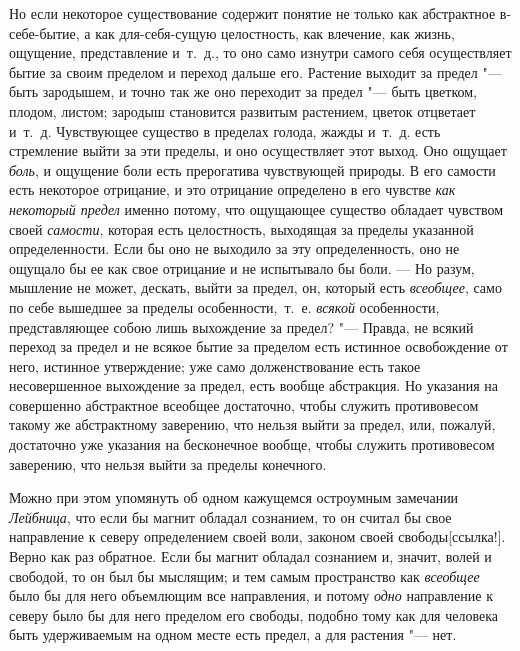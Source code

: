 Но если некоторое существование содержит понятие не только как абстрактное
в-себе-бытие, а как для-себя-сущую целостность, как влечение, как жизнь,
ощущение, представление и~т.~д., то оно само изнутри самого себя
осуществляет бытие за своим пределом и переход дальше его. Растение выходит
за предел "--- быть зародышем, и точно так же оно переходит за предел "--- быть
цветком, плодом, листом; зародыш становится развитым растением, цветок
отцветает и~т.~д. Чувствующее существо в пределах голода, жажды и~т.~д.
есть стремление выйти за эти пределы, и оно осуществляет этот выход. Оно
ощущает {\em боль}, и ощущение боли есть прерогатива
чувствующей природы. В его самости есть некоторое отрицание, и это
отрицание определено в его чувстве {\em как некоторый
предел} именно потому, что ощущающее существо обладает чувством своей
{\em самости}, которая есть целостность, выходящая за
пределы указанной определенности. Если бы оно не выходило за эту
определенность, оно не ощущало бы ее как свое отрицание и не испытывало бы
боли. — Но разум, мышление не может, дескать, выйти за предел, он, который
есть {\em всеобщее}, само по себе вышедшее за пределы
особенности,~т.~е. {\em всякой} особенности,
представляющее собою лишь выхождение за предел? "--- Правда, не всякий переход
за предел и не всякое бытие за пределом есть истинное освобождение от него,
истинное утверждение; уже само долженствование есть такое несовершенное
выхождение за предел, есть вообще абстракция. Но указания на совершенно
абстрактное всеобщее достаточно, чтобы служить противовесом такому же
абстрактному заверению, что нельзя выйти за предел, или, пожалуй,
достаточно уже указания на бесконечное вообще, чтобы служить противовесом
заверению, что нельзя выйти за пределы конечного.

Можно при этом упомянуть об одном кажущемся остроумным замечании
{\em Лейбница}, что если бы магнит обладал сознанием,
то он считал бы свое направление к северу определением своей воли, законом
своей свободы[ссылка!]. Верно как раз
обратное. Если бы магнит обладал сознанием и, значит, волей и свободой, то
он был бы мыслящим; и тем самым пространство как
{\em всеобщее} было бы для него объемлющим все
направления, и потому {\em одно} направление к северу
было бы для него пределом его свободы, подобно тому как для человека быть
удерживаемым на одном месте есть предел, а для растения "--- нет.

